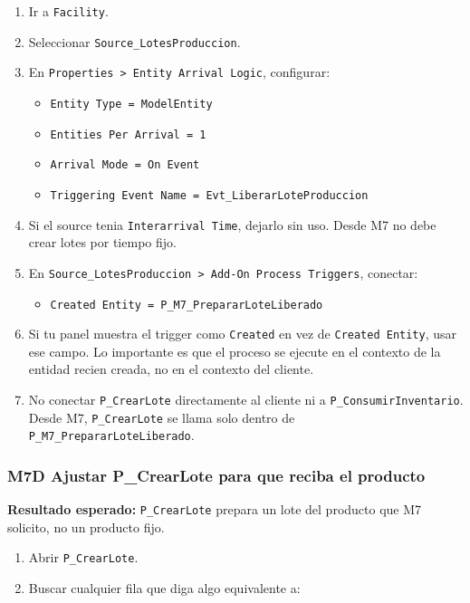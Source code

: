 \documentclass[11pt]{article}
\newcommand{\simio}[1]{\texttt{#1}}
\newcommand{\proc}[1]{\texttt{#1}}
\begin{document}
\begin{enumerate}
  \item Ir a \simio{Facility}.
  \item Seleccionar \simio{Source\_LotesProduccion}.
  \item En \simio{Properties > Entity Arrival Logic}, configurar:
  \begin{itemize}
    \item \simio{Entity Type = ModelEntity}
    \item \simio{Entities Per Arrival = 1}
    \item \simio{Arrival Mode = On Event}
    \item \simio{Triggering Event Name = Evt\_LiberarLoteProduccion}
  \end{itemize}
  \item Si el source tenia \simio{Interarrival Time}, dejarlo sin uso. Desde M7 no debe crear lotes por tiempo fijo.
  \item En \simio{Source\_LotesProduccion > Add-On Process Triggers}, conectar:
  \begin{itemize}
    \item \simio{Created Entity = P\_M7\_PrepararLoteLiberado}
  \end{itemize}
  \item Si tu panel muestra el trigger como \simio{Created} en vez de \simio{Created Entity}, usar ese campo. Lo importante es que el proceso se ejecute en el contexto de la entidad recien creada, no en el contexto del cliente.
  \item No conectar \proc{P\_CrearLote} directamente al cliente ni a \proc{P\_ConsumirInventario}. Desde M7, \proc{P\_CrearLote} se llama solo dentro de \proc{P\_M7\_PrepararLoteLiberado}.
\end{enumerate}

\subsubsection{M7D Ajustar P\_CrearLote para que reciba el producto}
\textbf{Resultado esperado:} \proc{P\_CrearLote} prepara un lote del producto que M7 solicito, no un producto fijo.

\begin{enumerate}
  \item Abrir \proc{P\_CrearLote}.
  \item Buscar cualquier fila que diga algo equivalente a:
\end{enumerate}
\end{document}
